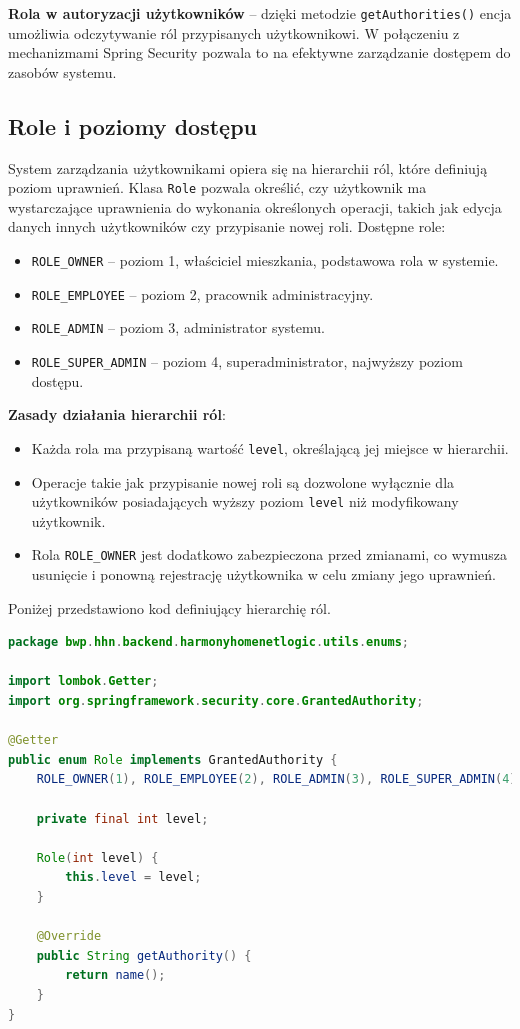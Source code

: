 \noindent \textbf{Rola w autoryzacji użytkowników} -- dzięki metodzie \texttt{getAuthorities()} encja umożliwia odczytywanie ról przypisanych użytkownikowi. W połączeniu z mechanizmami Spring Security pozwala to na efektywne zarządzanie dostępem do zasobów systemu.

\subsection{Role i poziomy dostępu}

System zarządzania użytkownikami opiera się na hierarchii ról, które definiują poziom uprawnień. Klasa \texttt{Role} pozwala określić, czy użytkownik ma wystarczające uprawnienia do wykonania określonych operacji, takich jak edycja danych innych użytkowników czy przypisanie nowej roli. Dostępne role:
\begin{itemize}
    \item \texttt{ROLE\_OWNER} -- poziom 1, właściciel mieszkania, podstawowa rola w systemie.
    \item \texttt{ROLE\_EMPLOYEE} -- poziom 2, pracownik administracyjny.
    \item \texttt{ROLE\_ADMIN} -- poziom 3, administrator systemu.
    \item \texttt{ROLE\_SUPER\_ADMIN} -- poziom 4, superadministrator, najwyższy poziom dostępu.
\end{itemize}

\noindent \textbf{Zasady działania hierarchii ról}:
\begin{itemize}
    \item Każda rola ma przypisaną wartość \texttt{level}, określającą jej miejsce w hierarchii.
    \item Operacje takie jak przypisanie nowej roli są dozwolone wyłącznie dla użytkowników posiadających wyższy poziom \texttt{level} niż modyfikowany użytkownik.
    \item Rola \texttt{ROLE\_OWNER} jest dodatkowo zabezpieczona przed zmianami, co wymusza usunięcie i ponowną rejestrację użytkownika w celu zmiany jego uprawnień.
\end{itemize}

\noindent Poniżej przedstawiono kod definiujący hierarchię ról.
\begin{lstlisting}[language=Java, style=JavaStyle, caption=Definicja ról w systemie \texttt{Role}]
package bwp.hhn.backend.harmonyhomenetlogic.utils.enums;

import lombok.Getter;
import org.springframework.security.core.GrantedAuthority;

@Getter
public enum Role implements GrantedAuthority {
    ROLE_OWNER(1), ROLE_EMPLOYEE(2), ROLE_ADMIN(3), ROLE_SUPER_ADMIN(4);

    private final int level;

    Role(int level) {
        this.level = level;
    }

    @Override
    public String getAuthority() {
        return name();
    }
}
\end{lstlisting}


